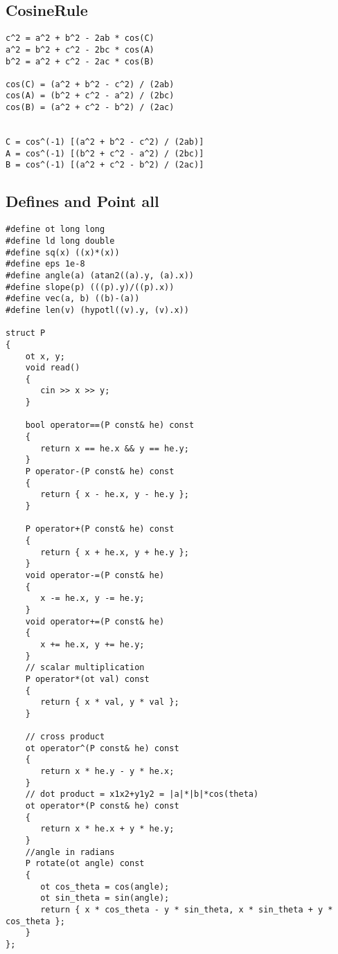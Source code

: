 \documentclass{article}
\begin{document}
\subsection{CosineRule}
\begin{verbatim}
c^2 = a^2 + b^2 - 2ab * cos(C) 
a^2 = b^2 + c^2 - 2bc * cos(A) 
b^2 = a^2 + c^2 - 2ac * cos(B)

cos(C) = (a^2 + b^2 - c^2) / (2ab) 
cos(A) = (b^2 + c^2 - a^2) / (2bc) 
cos(B) = (a^2 + c^2 - b^2) / (2ac)


C = cos^(-1) [(a^2 + b^2 - c^2) / (2ab)] 
A = cos^(-1) [(b^2 + c^2 - a^2) / (2bc)] 
B = cos^(-1) [(a^2 + c^2 - b^2) / (2ac)]\end{verbatim}

\subsection{Defines and Point all}
\begin{verbatim}
#define ot long long  
#define ld long double  
#define sq(x) ((x)*(x))  
#define eps 1e-8  
#define angle(a) (atan2((a).y, (a).x))  
#define slope(p) (((p).y)/((p).x))  
#define vec(a, b) ((b)-(a))  
#define len(v) (hypotl((v).y, (v).x))  
  
struct P  
{  
    ot x, y;  
    void read()  
    {  
       cin >> x >> y;  
    }  
  
    bool operator==(P const& he) const  
    {  
       return x == he.x && y == he.y;  
    }  
    P operator-(P const& he) const  
    {  
       return { x - he.x, y - he.y };  
    }  
  
    P operator+(P const& he) const  
    {  
       return { x + he.x, y + he.y };  
    }  
    void operator-=(P const& he)  
    {  
       x -= he.x, y -= he.y;  
    }  
    void operator+=(P const& he)  
    {  
       x += he.x, y += he.y;  
    }  
    // scalar multiplication  
    P operator*(ot val) const  
    {  
       return { x * val, y * val };  
    }  
  
    // cross product  
    ot operator^(P const& he) const  
    {  
       return x * he.y - y * he.x;  
    }  
    // dot product = x1x2+y1y2 = |a|*|b|*cos(theta)  
    ot operator*(P const& he) const  
    {  
       return x * he.x + y * he.y;  
    }  
    //angle in radians  
    P rotate(ot angle) const  
    {  
       ot cos_theta = cos(angle);  
       ot sin_theta = sin(angle);  
       return { x * cos_theta - y * sin_theta, x * sin_theta + y * cos_theta };  
    }  
};

\end{verbatim}
\end{document}
